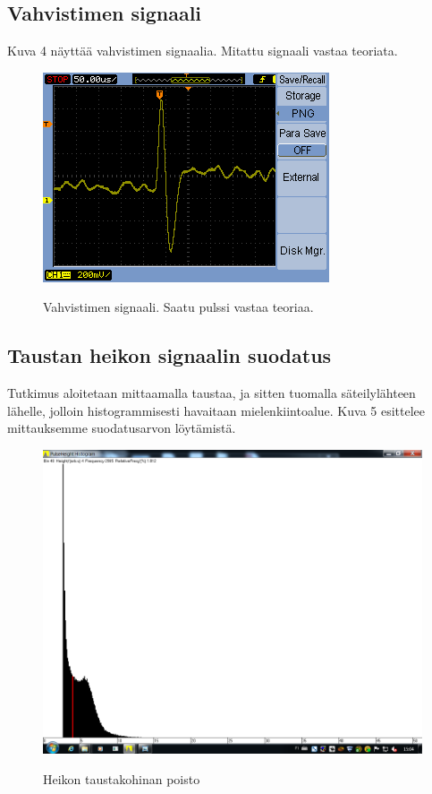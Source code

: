 \documentclass[a4paper, 12pt]{article}
\begin{document}
\subsection{Vahvistimen signaali}
Kuva 4 näyttää vahvistimen signaalia. Mitattu signaali vastaa teoriata.
\begin{figure}[!hbt]
\includegraphics[scale=1.2]{VahvistinSignaali}
\label{fig:VahvistimenSignaali}
\caption{Vahvistimen signaali. Saatu pulssi vastaa teoriaa. \cite{TyoMoniste}}
\end{figure}

\subsection{Taustan heikon signaalin suodatus}
Tutkimus aloitetaan mittaamalla taustaa, ja sitten tuomalla säteilylähteen lähelle, jolloin histogrammisesti havaitaan mielenkiintoalue. Kuva 5 esittelee mittauksemme suodatusarvon löytämistä.

\begin{figure}[!hbt]
\includegraphics[scale=0.5]{CuttingHistogram}
\label{fig:Cutting}
\caption{Heikon taustakohinan poisto}
\end{figure}
\end{document}
